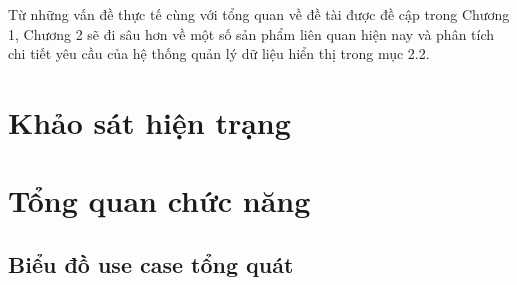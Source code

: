 \documentclass[../DoAn.tex]{subfiles}
\begin{document}
Từ những vấn đề thực tế cùng với tổng quan về đề tài được đề cập trong Chương 1, Chương 2 sẽ đi sâu hơn về một số sản phẩm liên quan hiện nay và phân tích chi tiết yêu cầu của hệ thống quản lý dữ liệu hiển thị trong mục 2.2.




\section{Khảo sát hiện trạng}
\label{section:2.1}

\section{Tổng quan chức năng}
\label{section:2.2}

\subsection{Biểu đồ use case tổng quát}
\label{subsection:2.2.1}
\end{document}
